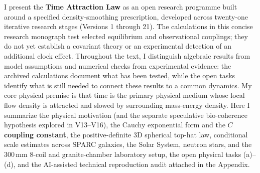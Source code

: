 \documentclass[10pt,a4paper]{article}
\begin{document}
{\small{}\par
I present the \textbf{Time Attraction Law} as an open research programme built around a specified density-smoothing prescription, developed across twenty-one iterative research stages (Versions 1 through 21). The calculations in this concise research monograph test selected equilibrium and observational couplings; they do not yet establish a covariant theory or an experimental detection of an additional clock effect. Throughout the text, I distinguish algebraic results from model assumptions and numerical checks from experimental evidence: the archived calculations document what has been tested, while the open tasks identify what is still needed to connect these results to a common dynamics. My core physical premise is that time is the primary physical medium whose local flow density is attracted and slowed by surrounding mass-energy density. Here I summarize the physical motivation (and the separate speculative bio-coherence hypothesis explored in V13--V16), the Cauchy exponential form and the \textbf{$C$ coupling constant}, the positive-definite 3D spherical top-hat law, conditional scale estimates across SPARC galaxies, the Solar System, neutron stars, and the $300\,\text{mm}$ 8-coil and granite-chamber laboratory setup, the open physical tasks (a)--(d), and the AI-assisted technical reproduction audit attached in the Appendix.

}
\end{document}
